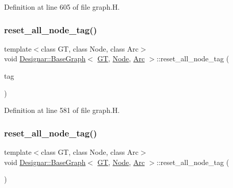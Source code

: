 Definition at line 605 of file graph.\+H.

\mbox{\label{class_designar_1_1_base_graph_a07ca1909d77210157b8b9571a4d35d6c}} 
\subsubsection{\texorpdfstring{reset\+\_\+all\+\_\+node\+\_\+tag()}{reset\_all\_node\_tag()}\hspace{0.1cm}{\footnotesize\ttfamily [1/2]}}
{\footnotesize\ttfamily template$<$class GT, class Node, class Arc$>$ \\
void \hyperlink{class_designar_1_1_base_graph}{Designar\+::\+Base\+Graph}$<$ \hyperlink{demo-buildgraph_8_c_a3001c40d2c31ca87ed96cd7d1334a55e}{GT}, \hyperlink{namespace_designar_a5af326c65aa2bd26b26c410f2030d09e}{Node}, \hyperlink{namespace_designar_a3f55fb5513d62ff47cbc8f72b8e95d6f}{Arc} $>$\+::reset\+\_\+all\+\_\+node\+\_\+tag (\begin{DoxyParamCaption}\item[{\hyperlink{namespace_designar_ac91366256ea6ea6ac5fd483d55a7499e}{Graph\+Tag}}]{tag }\end{DoxyParamCaption})\hspace{0.3cm}{\ttfamily [inline]}}



Definition at line 581 of file graph.\+H.

\mbox{\label{class_designar_1_1_base_graph_a7bffa4f055b15f76d12bd7c40730a3dd}} 
\subsubsection{\texorpdfstring{reset\+\_\+all\+\_\+node\+\_\+tag()}{reset\_all\_node\_tag()}\hspace{0.1cm}{\footnotesize\ttfamily [2/2]}}
{\footnotesize\ttfamily template$<$class GT, class Node, class Arc$>$ \\
void \hyperlink{class_designar_1_1_base_graph}{Designar\+::\+Base\+Graph}$<$ \hyperlink{demo-buildgraph_8_c_a3001c40d2c31ca87ed96cd7d1334a55e}{GT}, \hyperlink{namespace_designar_a5af326c65aa2bd26b26c410f2030d09e}{Node}, \hyperlink{namespace_designar_a3f55fb5513d62ff47cbc8f72b8e95d6f}{Arc} $>$\+::reset\+\_\+all\+\_\+node\+\_\+tag (\begin{DoxyParamCaption}{ }\end{DoxyParamCaption})\hspace{0.3cm}{\ttfamily [inline]}}



